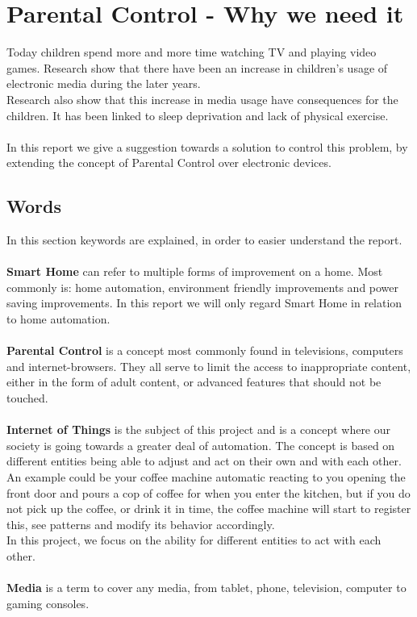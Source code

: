 \chapter{Parental Control - Why we need it} 
Today children spend more and more time watching TV and playing video games. Research show that there have been an increase in children's usage of electronic media during the later years. \citep{sundhedsstyrelsen}\\
Research also show that this increase in media usage have consequences for the children. It has been linked to sleep deprivation\citep{bmcPublicHealth} and lack of physical exercise\citep{bmcPublicHealth}.\\
\\
In this report we give a suggestion towards a solution to control this problem, by extending the concept of Parental Control over electronic devices.

\section{Words}
In this section keywords are explained, in order to easier understand the report.\\
\\
\textbf{Smart Home} can refer to multiple forms of improvement on a home. Most commonly is: home automation, environment friendly improvements and power saving improvements. In this report we will only regard Smart Home in relation to home automation.\\
\\
\textbf{Parental Control} is a concept most commonly found in televisions, computers and internet-browsers. They all serve to limit the access to inappropriate content, either in the form of adult content, or advanced features that should not be touched.\\
\\
\textbf{Internet of Things} is the subject of this project and is a concept where our society is going towards a greater deal of automation. The concept is based on different entities being able to adjust and act on their own and with each other. An example could be your coffee machine automatic reacting to you opening the front door and pours a cop of coffee for when you enter the kitchen, but if you do not pick up the coffee, or drink it in time, the coffee machine will start to register this, see patterns and modify its behavior accordingly.\citep{internetOfThings}\\
In this project, we focus on the ability for different entities to act with each other. \\
\\
\textbf{Media} is a term to cover any media, from tablet, phone, television, computer to gaming consoles.

